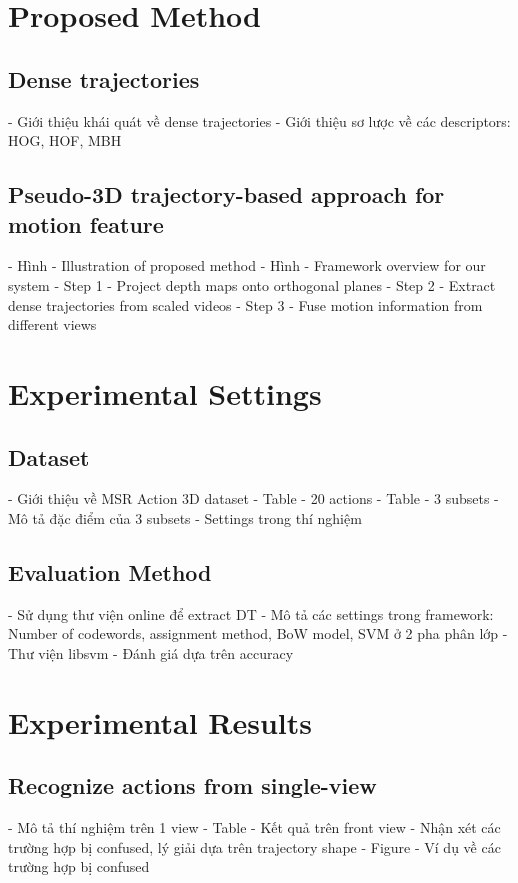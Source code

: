 \documentclass[review]{elsarticle}
\begin{document}
\section{Proposed Method}

\subsection{Dense trajectories}
- Giới thiệu khái quát về dense trajectories
- Giới thiệu sơ lược về các descriptors: HOG, HOF, MBH

\subsection{Pseudo-3D trajectory-based approach for motion feature}
- Hình - Illustration of proposed method
- Hình - Framework overview for our system
- Step 1 - Project depth maps onto orthogonal planes
- Step 2 - Extract dense trajectories from scaled videos
- Step 3 - Fuse motion information from different views

\section{Experimental Settings}

\subsection{Dataset}
- Giới thiệu về MSR Action 3D dataset
- Table - 20 actions
- Table - 3 subsets
- Mô tả đặc điểm của 3 subsets
- Settings trong thí nghiệm

\subsection{Evaluation Method}
- Sử dụng thư viện online để extract DT
- Mô tả các settings trong framework: Number of codewords, assignment method, BoW model, SVM ở 2 pha phân lớp
- Thư viện libsvm
- Đánh giá dựa trên accuracy

\section{Experimental Results}

\subsection{Recognize actions from single-view}
- Mô tả thí nghiệm trên 1 view
- Table - Kết quả trên front view
- Nhận xét các trường hợp bị confused, lý giải dựa trên trajectory shape
- Figure - Ví dụ về các trường hợp bị confused
\end{document}
